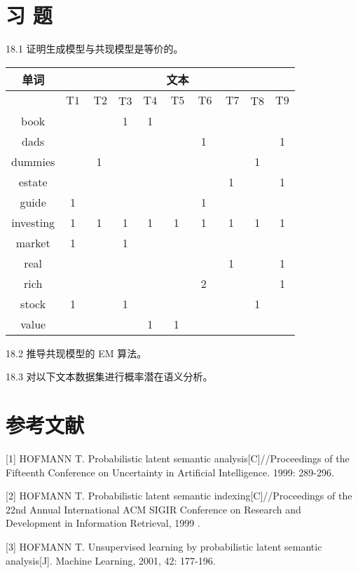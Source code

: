 \documentclass[10pt]{article}
\begin{document}
\section*{习 题}
18.1 证明生成模型与共现模型是等价的。

\begin{center}
\begin{tabular}{|c|c|c|c|c|c|c|c|c|c|}
\hline
\multirow{2}{*}{单词} & \multicolumn{9}{|c|}{文本} \\
\hline
 & $\mathrm{T} 1$ & $\mathrm{~T} 2$ & T3 & $\mathrm{T} 4$ & $\mathrm{~T} 5$ & $\mathrm{~T} 6$ & $\mathrm{~T} 7$ & T8 & $\mathrm{T} 9$ \\
\hline
book &  &  & 1 & 1 &  &  &  &  &  \\
\hline
dads &  &  &  &  &  & 1 &  &  & 1 \\
\hline
dummies &  & 1 &  &  &  &  &  & 1 &  \\
\hline
estate &  &  &  &  &  &  & 1 &  & 1 \\
\hline
guide & 1 &  &  &  &  & 1 &  &  &  \\
\hline
investing & 1 & 1 & 1 & 1 & 1 & 1 & 1 & 1 & 1 \\
\hline
market & 1 &  & 1 &  &  &  &  &  &  \\
\hline
real &  &  &  &  &  &  & 1 &  & 1 \\
\hline
rich &  &  &  &  &  & 2 &  &  & 1 \\
\hline
stock & 1 &  & 1 &  &  &  &  & 1 &  \\
\hline
value &  &  &  & 1 & 1 &  &  &  &  \\
\hline
\end{tabular}
\end{center}

18.2 推导共现模型的 EM 算法。

18.3 对以下文本数据集进行概率潜在语义分析。

\section*{参考文献}
[1] HOFMANN T. Probabilistic latent semantic analysis[C]//Proceedings of the Fifteenth Conference on Uncertainty in Artificial Intelligence. 1999: 289-296.

[2] HOFMANN T. Probabilistic latent semantic indexing[C]//Proceedings of the 22nd Annual International ACM SIGIR Conference on Research and Development in Information Retrieval, 1999 .

[3] HOFMANN T. Unsupervised learning by probabilistic latent semantic analysis[J]. Machine Learning, 2001, 42: 177-196.
\end{document}
